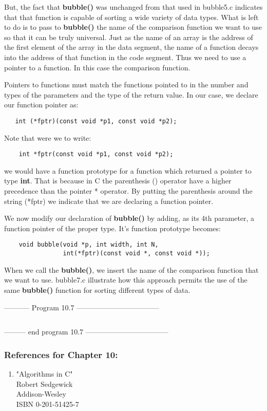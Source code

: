But, the fact that \textbf{bubble()} was unchanged from that used in
bubble5.c indicates that that function is capable of sorting a wide
variety of data types. What is left to do is to pass to
\textbf{bubble()} the name of the comparison function we want to use so
that it can be truly universal. Just as the name of an array is the
address of the first element of the array in the data segment, the name
of a function decays into the address of that function in the code
segment. Thus we need to use a pointer to a function. In this case the
comparison function.

Pointers to functions must match the functions pointed to in the number
and types of the parameters and the type of the return value. In our
case, we declare our function pointer as:

\begin{verbatim}
   int (*fptr)(const void *p1, const void *p2);
\end{verbatim}

Note that were we to write:

\begin{verbatim}
    int *fptr(const void *p1, const void *p2);
\end{verbatim}

we would have a function prototype for a function which returned a
pointer to type \textbf{int}. That is because in C the parenthesis ()
operator have a higher precedence than the pointer * operator. By
putting the parenthesis around the string (*fptr) we indicate that we
are declaring a function pointer.

We now modify our declaration of \textbf{bubble()} by adding, as its 4th
parameter, a function pointer of the proper type. It's function
prototype becomes:

\begin{verbatim}
    void bubble(void *p, int width, int N,
                int(*fptr)(const void *, const void *));
\end{verbatim}

When we call the \textbf{bubble()}, we insert the name of the comparison
function that we want to use. bubble7.c illustrate how this approach
permits the use of the same \textbf{bubble()} function for sorting
different types of data.

-----------  Program 10.7  -----------------------------------
\inputminted{c}{../src/ch10-7.c}
--------- end program 10.7 -----------------------------------

\hypertarget{references-for-chapter-10}{%
\subsubsection{References for Chapter
10:}\label{references-for-chapter-10}}

\begin{enumerate}
\tightlist
\item
  "Algorithms in C"\\
  Robert Sedgewick\\
  Addison-Wesley\\
  ISBN 0-201-51425-7\\
\end{enumerate}

\begin{comment}
\href{epilogx.htm}{Epilog}

\href{pointers.htm}{Back to Table of Contents}
\end{comment}
